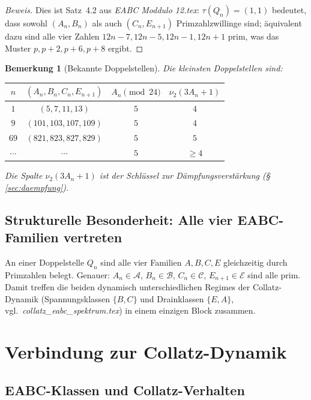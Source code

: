 \documentclass[12pt,a4paper]{article}
\newtheorem{bemerkung}[definition]{Bemerkung}
\newenvironment{beweis}{\begin{proof}[Beweis]}{\end{proof}}
\newcommand{\vii}{\nu_2}
\begin{document}
\begin{beweis}
Dies ist Satz~4.2 aus \textit{EABC Moddulo 12.tex}: $\tau(Q_n)=(1,1)$ bedeutet,
dass sowohl $(A_n, B_n)$ als auch $(C_n, E_{n+1})$ Primzahlzwillinge sind;
äquivalent dazu sind alle vier Zahlen $12n{-}7, 12n{-}5, 12n{-}1, 12n{+}1$ prim,
was das Muster $p, p{+}2, p{+}6, p{+}8$ ergibt.
\end{beweis}

\begin{bemerkung}[Bekannte Doppelstellen]
Die kleinsten Doppelstellen sind:
\begin{center}
\renewcommand{\arraystretch}{1.3}
\begin{tabular}{cccc}
\toprule
$n$ & $(A_n, B_n, C_n, E_{n+1})$ & $A_n \pmod{24}$ & $\vii(3A_n+1)$ \\
\midrule
$1$ & $(5, 7, 11, 13)$ & $5$ & $4$ \\
$9$ & $(101, 103, 107, 109)$ & $5$ & $4$ \\
$69$ & $(821, 823, 827, 829)$ & $5$ & $5$ \\
$\cdots$ & $\cdots$ & $5$ & $\geq 4$ \\
\bottomrule
\end{tabular}
\end{center}
Die Spalte $\vii(3A_n+1)$ ist der Schlüssel zur Dämpfungsverstärkung (§\,\ref{sec:daempfung}).
\end{bemerkung}

\subsection{Strukturelle Besonderheit: Alle vier EABC-Familien vertreten}

An einer Doppelstelle $Q_n$ sind alle vier Familien $A, B, C, E$ gleichzeitig
durch Primzahlen belegt. Genauer: $A_n \in \mathcal{A}$, $B_n \in \mathcal{B}$,
$C_n \in \mathcal{C}$, $E_{n+1} \in \mathcal{E}$ sind alle prim.
Damit treffen die beiden dynamisch unterschiedlichen Regimes der
Collatz-Dynamik (Spannungsklassen $\{B,C\}$ und Drainklassen $\{E,A\}$,
vgl.\ \textit{collatz\_eabc\_spektrum.tex}) in einem einzigen Block zusammen.

\section{Verbindung zur Collatz-Dynamik}
\label{sec:verbindung}

\subsection{EABC-Klassen und Collatz-Verhalten}
\end{document}
